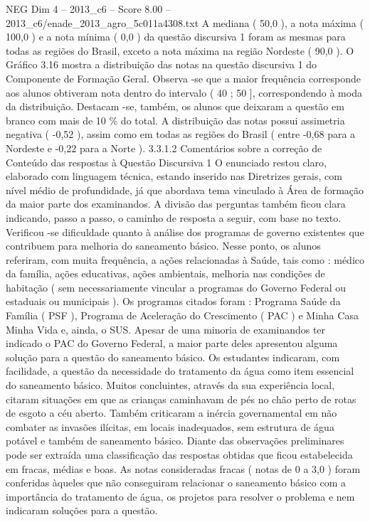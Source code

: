 \begin{textsample}{NEG Dim 4 – 2013\_c6 – Score 8.00 – 2013\_c6/enade\_2013\_agro\_5c011a4308.txt}
A mediana ( 50,0 ), a nota máxima ( 100,0 ) e a nota mínima ( 0,0 ) da questão discursiva 1 foram as mesmas para todas as regiões do Brasil, exceto a nota máxima na região Nordeste ( 90,0 ).
O Gráfico 3.16 mostra a distribuição das notas na questão discursiva 1 do Componente de Formação Geral.
Observa -se que a maior frequência corresponde aos alunos obtiveram nota dentro do intervalo ( 40 ; 50 ], correspondendo à moda da distribuição.
Destacam -se, também, os alunos que deixaram a questão em branco com mais de 10 \% do total.
A distribuição das notas possui assimetria negativa ( -0,52 ), assim como em todas as regiões do Brasil ( entre -0,68 para a Nordeste e -0,22 para a Norte ). 3.3.1.2 Comentários sobre a correção de Conteúdo das respostas à Questão Discursiva 1 O enunciado restou claro, elaborado com linguagem técnica, estando inserido nas Diretrizes gerais, com nível médio de profundidade, já que abordava tema vinculado à Área de formação da maior parte dos examinandos.
A divisão das perguntas também ficou clara indicando, passo a passo, o caminho de resposta a seguir, com base no texto.
Verificou -se dificuldade quanto à análise dos programas de governo existentes que contribuem para melhoria do saneamento básico.
Nesse ponto, os alunos referiram, com muita frequência, a ações relacionadas à Saúde, tais como : médico da família, ações educativas, ações ambientais, melhoria nas condições de habitação ( sem necessariamente vincular a programas do Governo Federal ou estaduais ou municipais ).
Os programas citados foram : Programa Saúde da Família ( PSF ), Programa de Aceleração do Crescimento ( PAC ) e Minha Casa Minha Vida e, ainda, o SUS.
Apesar de uma minoria de examinandos ter indicado o PAC do Governo Federal, a maior parte deles apresentou alguma solução para a questão do saneamento básico.
Os estudantes indicaram, com facilidade, a questão da necessidade do tratamento da água como item essencial do saneamento básico.
Muitos concluintes, através da sua experiência local, citaram situações em que as crianças caminhavam de pés no chão perto de rotas de esgoto a céu aberto.
Também criticaram a inércia governamental em não combater as invasões ilícitas, em locais inadequados, sem estrutura de água potável e também de saneamento básico.
Diante das observações preliminares pode ser extraída uma classificação das respostas obtidas que ficou estabelecida em fracas, médias e boas.
As notas consideradas fracas ( notas de 0 a 3,0 ) foram conferidas àqueles que não conseguiram relacionar o saneamento básico com a importância do tratamento de água, os projetos para resolver o problema e nem indicaram soluções para a questão.

\end{textsample}
